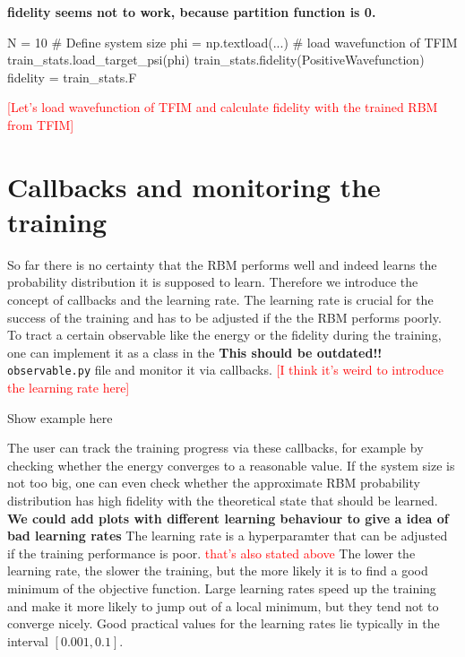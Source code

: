 \documentclass[submission, Phys]{SciPost}
\begin{document}
\textbf{fidelity seems not to work, because partition function is 0.}

\begin{python}
	N = 10 # Define system size
	phi = np.textload(...) # load wavefunction of TFIM
	train_stats.load_target_psi(phi)
	train_stats.fidelity(PositiveWavefunction)
	fidelity = train_stats.F
\end{python}

\textcolor{red}{[Let's load wavefunction of TFIM and calculate fidelity with the trained RBM from TFIM]}

\section{Callbacks and monitoring the training}
\label{Sec:Callbacks}

So far there is no certainty that the RBM performs well and indeed learns the probability distribution it is supposed to learn.
Therefore we introduce the concept of callbacks and the learning rate. The learning rate is crucial for the success of the training
and has to be adjusted if the the RBM performs poorly.
To tract a certain observable like the energy or the fidelity during the training, one can implement it as a class in the \textbf{This should be outdated!!} \verb|observable.py| file and monitor it via callbacks.
\textcolor{red}{[I think it's weird to introduce the learning rate here]}

\begin{python}
	Show example here
\end{python}

The user can track the training progress via these callbacks, for example by checking whether the energy converges to a reasonable value.
If the system size is not too big, one can even check whether the approximate RBM probability distribution has high fidelity with the theoretical state that should be learned.
\textbf{We could add plots with different learning behaviour to give a idea of bad learning rates}
The learning rate is a hyperparamter that can be adjusted if the training performance is poor. \textcolor{red}{that's also stated above}
The lower the learning rate, the slower the training, but the more likely it is to find a good minimum of the objective function.
Large learning rates speed up the training and make it more likely to jump out of a local minimum, but they tend not to converge nicely.
Good practical values for the learning rates lie typically in the interval $[0.001, 0.1]$.
\end{document}

